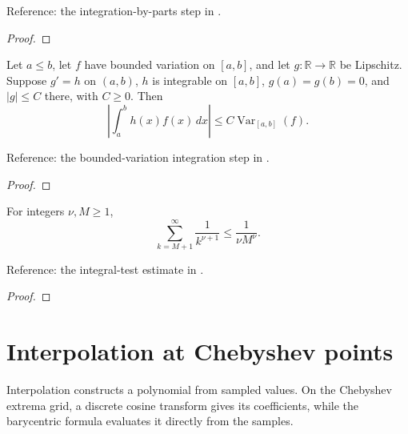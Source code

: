 \begin{supporting}
\begin{theorem}
Reference: the integration-by-parts step in \cite[Chapter 7]{atap}.
\end{theorem}
\begin{proof}
\leanok
\end{proof}

\begin{theorem}
\label{thm:bv-interval-bound}
\leanok
Let $a\le b$, let $f$ have bounded variation on $[a,b]$, and let
$g:\mathbb R\to\mathbb R$ be Lipschitz. Suppose $g'=h$ on $(a,b)$,
$h$ is integrable on $[a,b]$, $g(a)=g(b)=0$, and $|g|\le C$ there, with $C\ge0$.
Then
\[
\left|\int_a^b h(x)f(x)\,dx\right|
 \le C\operatorname{Var}_{[a,b]}(f).
\]

Reference: the bounded-variation integration step in \cite[Chapter 7]{atap}.
\end{theorem}
\begin{proof}
\leanok
\end{proof}

\begin{theorem}
\label{thm:pseries-tail}
\leanok
For integers $\nu,M\ge1$,
\[
\sum_{k=M+1}^{\infty}\frac{1}{k^{\nu+1}}
 \le\frac{1}{\nu M^\nu}.
\]

Reference: the integral-test estimate in \cite[Theorem 7.2]{atap}.
\end{theorem}
\begin{proof}
\leanok
\end{proof}

\end{supporting}

\chapter{Interpolation at Chebyshev points}\label{chap:interpolation}


Interpolation constructs a polynomial from sampled values. On the Chebyshev extrema grid, a discrete cosine transform gives its coefficients, while the barycentric formula evaluates it directly from the samples.

